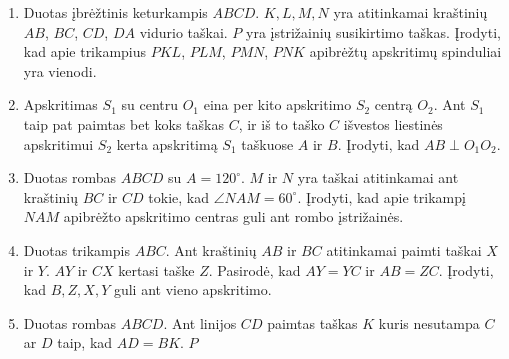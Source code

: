 \begin{enumerate}
  \item Duotas įbrėžtinis keturkampis $ABCD$. $K, L, M, N$ yra
    atitinkamai kraštinių $AB$, $BC$, $CD$, $DA$ vidurio
    taškai. $P$ yra įstrižainių susikirtimo taškas. Įrodyti,
    kad apie trikampius $PKL$, $PLM$, $PMN$, $PNK$ apibrėžtų
    apskritimų spinduliai yra vienodi.
  \item Apskritimas $S_1$ su centru $O_1$ eina per kito
    apskritimo $S_2$ centrą $O_2$. Ant $S_1$ taip pat paimtas
    bet koks taškas $C$, ir iš to taško $C$ išvestos liestinės
    apskritimui $S_2$ kerta apskritimą $S_1$ taškuose $A$ ir
    $B$. Įrodyti, kad $AB\perp{O_1 O_2}$. 
  \item Duotas rombas $ABCD$ su $A=120^\circ$. $M$ ir $N$ yra
    taškai atitinkamai ant kraštinių $BC$ ir $CD$ tokie, kad
    $\angle NAM=60^\circ$. Įrodyti, kad apie trikampį $NAM$
    apibrėžto apskritimo centras guli ant rombo įstrižainės.
  \item Duotas trikampis $ABC$. Ant kraštinių $AB$ ir $BC$
    atitinkamai paimti taškai $X$ ir $Y$. $AY$ ir $CX$ kertasi
    taške $Z$. Pasirodė, kad $AY = YC$ ir $AB = ZC$.
    Įrodyti, kad $B, Z, X, Y$ guli ant vieno apskritimo.
  \item Duotas rombas $ABCD$. Ant linijos $CD$ paimtas taškas
    $K$ kuris nesutampa $C$ ar $D$ taip, kad $AD = BK$. $P$

\end{enumerate}
